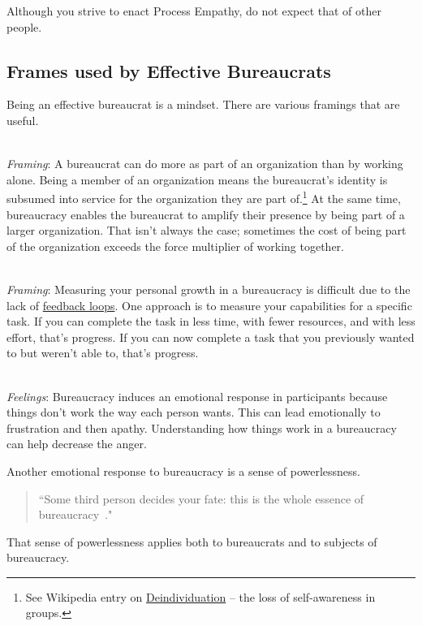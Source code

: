 Although you strive to enact Process Empathy, do not expect that of other people. 

\subsection*{Frames used by Effective Bureaucrats}

Being an effective bureaucrat is a mindset.  %
There are various framings that are useful. 

\ \\
\textit{Framing}: A bureaucrat can do more as part of an organization than by working alone. Being a member of an organization means the bureaucrat's identity is subsumed into service for the organization they are part of.\footnote{See Wikipedia entry on \href{https://en.wikipedia.org/wiki/Deindividuation}{Deindividuation} -- the loss of self-awareness in groups.
} At the same time, bureaucracy enables the bureaucrat to amplify their presence by being part of a larger organization.  That isn't always the case; sometimes the cost of being part of the organization exceeds the force multiplier of working together. 

\ \\
\textit{Framing}: Measuring your personal growth in a bureaucracy is difficult due to the lack of \hyperref[sec:feedback-loop-and-ripples]{feedback loops}. One approach is to measure your capabilities for a specific task. If you can complete the task in less time, with fewer resources, and with less effort, that's progress. If you can now complete a task that you previously wanted to but weren't able to, that's progress.


\ \\
\textit{Feelings}: Bureaucracy induces an emotional response in participants because things don't work the way each person wants. This can lead emotionally to frustration and then apathy. Understanding how things work in a bureaucracy can help decrease the anger.


Another emotional response to bureaucracy is a sense of powerlessness. 
\begin{quote}
``Some third person decides your fate: this is the whole essence of bureaucracy~\cite{1921_Kollontai}."
\end{quote}
That sense of powerlessness applies both to bureaucrats and to subjects of bureaucracy. 

